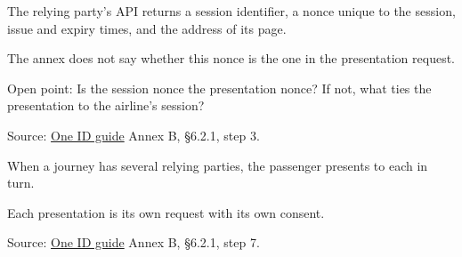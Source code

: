 \begin{definition}
  \label{def:c95}
  \notready
  The relying party's API returns a session identifier, a nonce unique to the
  session, issue and expiry times, and the address of its page.

  The annex does not say whether this nonce is the one in the presentation
  request.

  Open point: Is the session nonce the presentation nonce? If not, what ties
  the presentation to the airline's session?

  Source:
  \href{https://standards.atlassian.net/wiki/spaces/OneID/pages/2947416082/Technical+Implementation+Guide}{One
  ID guide} Annex B, §6.2.1, step 3.
\end{definition}

\begin{definition}
  \label{def:c96}
  When a journey has several relying parties, the passenger presents to each
  in turn.

  Each presentation is its own request with its own consent.

  Source:
  \href{https://standards.atlassian.net/wiki/spaces/OneID/pages/2947416082/Technical+Implementation+Guide}{One
  ID guide} Annex B, §6.2.1, step 7.
\end{definition}
